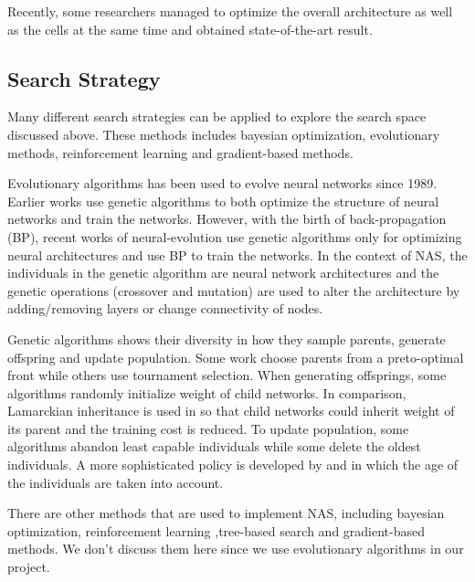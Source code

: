 \documentclass[conference]{IEEEtran}
\begin{document}
    Recently, some researchers managed to optimize the overall architecture as well as the cells at the same time and obtained state-of-the-art result\cite{liu2019auto}.
    
    \subsection{Search Strategy}
    
    Many different search strategies can be applied to explore the search space discussed above. These methods includes bayesian optimization, evolutionary methods, reinforcement learning and gradient-based methods. 

    Evolutionary algorithms has been used to evolve neural networks since 1989\cite{miller1989designing}. Earlier works use genetic algorithms to both optimize the structure of neural networks and train the networks\cite{stanley2002evolving}. However, with the birth of back-propagation (BP), recent works of neural-evolution use genetic algorithms only for optimizing neural architectures and use BP to train the networks\cite{real2017large}. In the context of NAS, the individuals in the genetic algorithm are neural network architectures and the genetic operations (crossover and mutation) are used to alter the architecture by adding/removing layers or change connectivity of nodes.

    Genetic algorithms shows their diversity in how they sample parents, generate offspring and update population. Some work choose parents from a preto-optimal front\cite{elsken2018efficient} while others use tournament selection\cite{liu2018progressive}\cite{real2018regularized}\cite{real2017large}. When generating offsprings, some algorithms randomly initialize weight of child networks. In comparison, Lamarckian inheritance is used in \cite{elsken2018efficient} so that child networks could inherit weight of its parent and the training cost is reduced. To update population, some algorithms abandon least capable individuals\cite{real2017large} while some delete the oldest individuals\cite{real2018regularized}. A more sophisticated policy is developed by \cite{Hornby:2006:AAP:1143997.1144142} and \cite{DBLP:journals/corr/abs-1802-01548} in which the age of the individuals are taken into account.
    
    There are other methods that are used to implement NAS, including bayesian optimization, reinforcement learning ,tree-based search and gradient-based methods. We don't discuss them here since we use evolutionary algorithms in our project.
\end{document}

